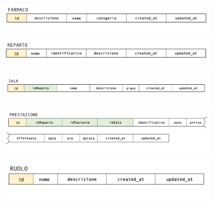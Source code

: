 \documentclass[paper=a4, fontsize=11pt,x11names]{report}
\begin{document}
\begin{figure}[H]
\begin{center}
\includegraphics[scale=0.3]{farmacoSchema}
\end{center}
\end{figure}

\begin{figure}[H]
\begin{center}
\includegraphics[scale=0.3]{repartoSchema}
\end{center}
\end{figure}

\begin{figure}[H]
\begin{center}
\includegraphics[scale=0.3]{salaSchema}
\end{center}
\end{figure}

\begin{figure}[H]
\begin{center}
\includegraphics[scale=0.26]{prestazioneSchema}
\end{center}
\end{figure}

\begin{figure}[H]
\begin{center}
\includegraphics[scale=0.26]{permessiSchema}
\end{center}
\end{figure}
\end{document}
